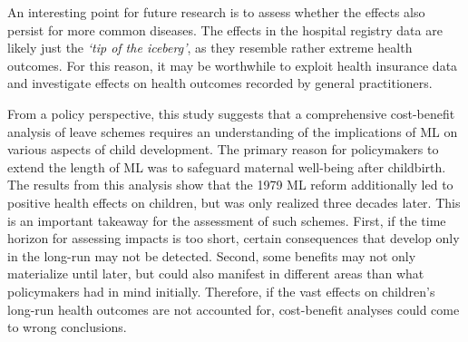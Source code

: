 An interesting point for future research is to assess whether the effects also persist for more common diseases. The effects in the hospital registry data are likely just the \textit{`tip of the iceberg'}, as they resemble rather extreme health outcomes. For this reason, it may be worthwhile to exploit health insurance data and investigate effects on health outcomes recorded by general practitioners.



From a policy perspective, this study suggests that a comprehensive cost-benefit analysis of leave schemes requires an understanding of the implications of ML on various aspects of child development. The primary reason for policymakers to extend the length of ML was to safeguard maternal well-being after childbirth. The results from this analysis show that the 1979 ML reform additionally led to positive health effects on children, but was only realized three decades later. This is an important takeaway for the assessment of such schemes. First, if the time horizon for assessing impacts is too short, certain consequences that develop only in the long-run may not be detected. Second, some benefits may not only materialize until later, but could also manifest in different areas than what policymakers had in mind initially. Therefore, if the vast effects on children's long-run health outcomes are not accounted for, cost-benefit analyses could come to wrong conclusions. %



 

 


